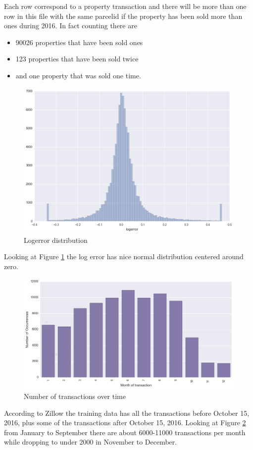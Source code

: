 \documentclass[a4paper]{article}
\begin{document}
Each row correspond to a property transaction and there will be more than one row in this file with the same
parcelid if the property has been sold more than ones during 2016. In fact counting there are
\begin{itemize}
    \item 90026 properties that have been sold ones
    \item 123 properties that have been sold twice
    \item and one property that was sold one time.
\end{itemize}

\begin{figure}
\centering
\includegraphics[width=1\textwidth]{./img/train-logerror.png}
\caption{\label{fig:logerror}Logerror distribution}
\end{figure}
Looking at Figure \ref{fig:logerror} the log error has nice normal distribution centered around zero.

\begin{figure}
\centering
\includegraphics[width=1\textwidth]{./img/train-transactiondate.png}
\caption{\label{fig:transactions}Number of transactions over time}
\end{figure}
According to Zillow the training data has all the transactions before October 15, 2016, plus some of the transactions
after October 15, 2016. Looking at Figure \ref{fig:transactions} from January to September there are about 6000-11000
transactions per month while dropping to under 2000 in November to December.
\end{document}
